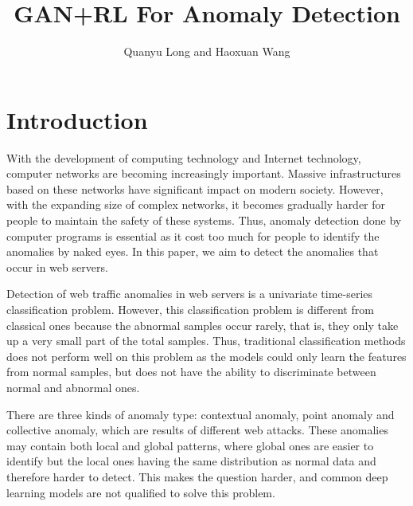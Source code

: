 \documentclass{acmtog} %
\begin{document}

\title{GAN+RL For Anomaly Detection} %

\author{Quanyu Long {\upshape and} Haoxuan Wang
}


\maketitle

\section{Introduction}
With the development of computing technology and Internet technology, computer networks are becoming increasingly important. Massive infrastructures based on these networks have significant impact on modern society. However, with the expanding size of complex networks, it becomes gradually harder for people to maintain the safety of these systems. Thus, anomaly detection done by computer programs is essential as it cost too much for people to identify the anomalies by naked eyes. In this paper, we aim to detect the anomalies that occur in web servers. 

Detection of web traffic anomalies in web servers is a univariate time-series classification problem. However, this classification problem is different from classical ones because the abnormal samples occur rarely, that is, they only take up a very small part of the total samples. Thus, traditional classification methods does not perform well on this problem as the models could only learn the features from normal samples, but does not have the ability to discriminate between normal and abnormal ones. 

There are three kinds of anomaly type: contextual anomaly, point anomaly and collective anomaly, which are results of different web attacks. These anomalies may contain both local and global patterns, where global ones are easier to identify but the local ones having the same distribution as normal data and therefore harder to detect. This makes the question harder, and common deep learning models are not qualified to solve this problem.  
\end{document}
